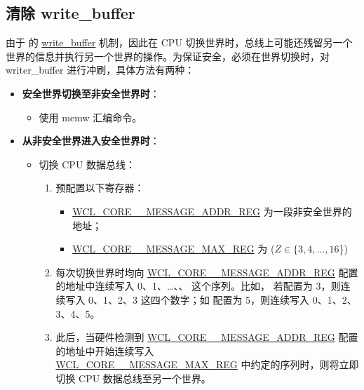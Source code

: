 \documentclass[main\_\_CN.tex]{subfiles}
\begin{document}
\subsection{清除 write\_buffer}\label{sec:wctrl-writer-buffer}

由于 \chipname{} 的 \href{https://en.wikipedia.org/wiki/Write_buffer}{write\_buffer} 机制，因此在 CPU 切换世界时，总线上可能还残留另一个世界的信息并执行另一个世界的操作。为保证安全，必须在世界切换时，对 writer\_buffer 进行冲刷，具体方法有两种：
\begin{itemize}
    \item \textbf{安全世界切换至非安全世界时}：
    \begin{itemize}
        \item 使用 memw 汇编命令。
    \end{itemize}
    \item \textbf{从非安全世界进入安全世界时}：
    \begin{itemize}
        \item 切换 CPU 数据总线：
            \begin{enumerate}
        \item 预配置以下寄存器：
        \begin{itemize}
            \item \hyperref[regdesc:WCLCORE0MESSAGEADDRREG]{WCL\_CORE\_\_MESSAGE\_ADDR\_REG} 为一段非安全世界的地址；
        \item \hyperref[regdesc:WCLCORE0MESSAGEMAXREG]{WCL\_CORE\_\_MESSAGE\_MAX\_REG} 为  (\begin{math} Z \in \{ 3, 4, \dots, 16 \end{math}\})
        \end{itemize}
        \item 每次切换世界时均向 \hyperref[regdesc:WCLCORE0MESSAGEADDRREG]{WCL\_CORE\_\_MESSAGE\_ADDR\_REG} 配置的地址中连续写入 0、1、\dots 、、 这个序列。比如， 若配置为 3，则连续写入 0、1、2、3 这四个数字；如  配置为 5，则连续写入 0、1、2、3、4、5。
        \item 此后，当硬件检测到 \hyperref[regdesc:WCLCORE0MESSAGEADDRREG]{WCL\_CORE\_\_MESSAGE\_ADDR\_REG} 配置的地址中开始连续写入 \\ \hyperref[regdesc:WCLCORE0MESSAGEMAXREG]{WCL\_CORE\_\_MESSAGE\_MAX\_REG} 中约定的序列时，则将立即切换 CPU 数据总线至另一个世界。
    \end{enumerate}
    \end{itemize}
\end{itemize}
\end{document}
